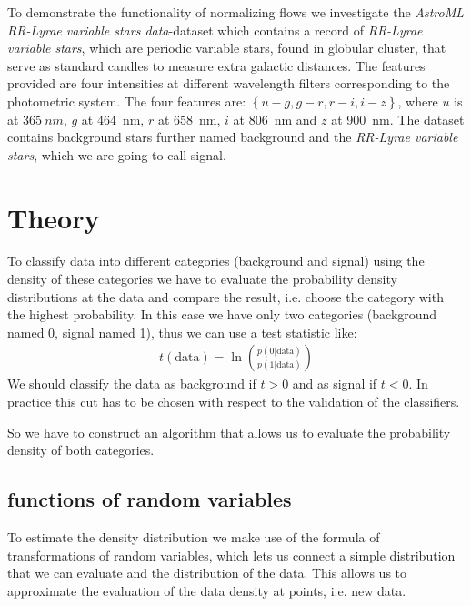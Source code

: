 \documentclass[%
 reprint,
 amsmath,amssymb,
 aps,
]{revtex4-2}
\begin{document}
To demonstrate the functionality of normalizing flows we investigate the \textit{AstroML RR-Lyrae variable stars data}-dataset which contains a record of \textit{RR-Lyrae variable stars}, which are periodic variable stars, found in globular cluster, that serve as standard candles to measure extra galactic distances. The features provided are four intensities at different wavelength filters corresponding to the photometric system. The four features are: $\left\{u-g, g-r, r-i, i-z\right\}$, where $u$ is at $\SI{365}{nm}$, $g$ at \SI{464}{nm}, $r$ at \SI{658}{nm}, $i$ at \SI{806}{nm} and $z$ at \SI{900}{nm}. The dataset contains background stars  further named background and the \textit{RR-Lyrae variable stars}, which we are going to call signal.


\section{Theory}
\label{sec:theory 1}
To classify data into different categories (background and signal) using the density of these categories we have to evaluate the probability density distributions at the data and compare the result, i.e. choose the category with the highest probability. In this case we have only two categories (background named 0, signal named 1), thus we can use a test statistic like:
\begin{align*}
	t(\text{data}) = \ln(\frac{p(0|\text{data})}{p(1|\text{data})})
\end{align*}
We should classify the data as background if $t>0$ and as signal if $t<0$. In practice this cut has to be chosen with respect to the validation of the classifiers. 

So we have to construct an algorithm that allows us to evaluate the probability density of both categories. 
\subsection{functions of random variables}
To estimate the density distribution we make use of the formula of  transformations of random variables, which lets us connect a simple distribution that we can evaluate and the distribution of the data. This allows us to approximate the evaluation of the data density at points, i.e. new data. 
\end{document}
